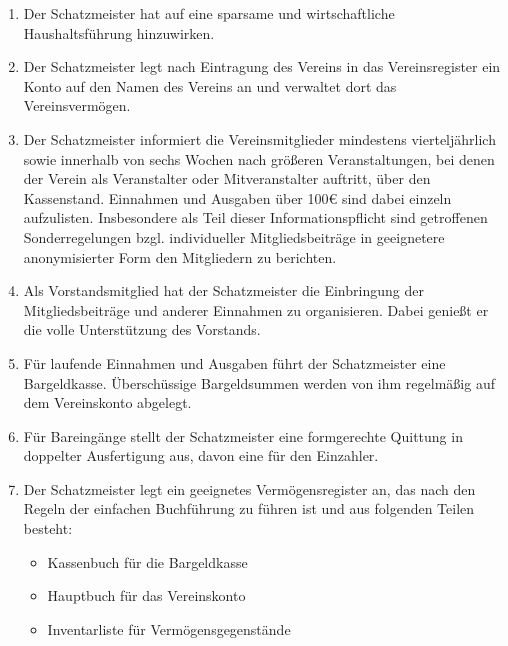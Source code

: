 \documentclass[fontsize=12pt,paper=a4,pagesize,headings=small]{scrartcl}
\begin{document}
\begin{enumerate}
    \item Der Schatzmeister hat auf eine sparsame und wirtschaftliche
        Haushaltsführung hinzuwirken.

    \item Der Schatzmeister legt nach Eintragung des Vereins in das
        Vereinsregister ein Konto auf den Namen des Vereins an und
        verwaltet dort das Vereinsvermögen.

    \item Der Schatzmeister informiert die Vereinsmitglieder
        mindestens vierteljährlich sowie innerhalb von sechs Wochen
        nach größeren Veranstaltungen, bei denen der Verein als
        Veranstalter oder Mitveranstalter auftritt, über den
        Kassenstand. Einnahmen und Ausgaben über 100\euro{} sind dabei
        einzeln aufzulisten. Insbesondere als Teil dieser Informationspflicht 
        sind getroffenen Sonderregelungen bzgl. individueller Mitgliedsbeiträge
        in geeignetere anonymisierter Form den Mitgliedern zu berichten.

    \item Als Vorstandsmitglied hat der Schatzmeister die Einbringung der
        Mitgliedsbeiträge und anderer Einnahmen zu organisieren. Dabei
        genießt er die volle Unterstützung des Vorstands.

    \item Für laufende Einnahmen und Ausgaben führt der Schatzmeister eine
        Bargeldkasse. Überschüssige Bargeldsummen werden von ihm regelmäßig
        auf dem Vereinskonto abgelegt.

    \item Für Bareingänge stellt der Schatzmeister eine formgerechte
        Quittung in doppelter Ausfertigung aus, davon eine für den Einzahler.

    \newpage{}

    \item Der Schatzmeister legt ein geeignetes Vermögensregister an, das
        nach den Regeln der einfachen Buchführung zu führen ist und aus
        folgenden Teilen besteht:
        \begin{itemize}
            \item Kassenbuch für die Bargeldkasse
            \item Hauptbuch für das Vereinskonto
            \item Inventarliste für Vermögensgegenstände
        \end{itemize}


\end{enumerate}
\end{document}

